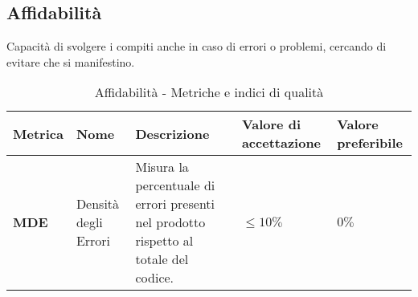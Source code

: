 \subsection{Affidabilità}
Capacità di svolgere i compiti anche in caso di errori o problemi, cercando di evitare che si manifestino. 
\begin{table}[H]
    \centering
    \begin{tabular}{|C{1.5cm}|L{3cm}|L{4cm}|L{2.5cm}|L{2.5cm}|}
        \hline
        \textbf{Metrica} & \textbf{Nome} & \textbf{Descrizione} & \textbf{Valore di accettazione} & \textbf{Valore preferibile} \\
        \hline
        \textbf{MDE} & Densità degli Errori & Misura la percentuale di errori presenti nel prodotto rispetto al totale del codice. & $\leq 10\%$ & $0\%$ \\
        \hline
    \end{tabular}
    \caption{Affidabilità - Metriche e indici di qualità}
    \label{tab:affidabilità_qualita_prodotto}
\end{table}
